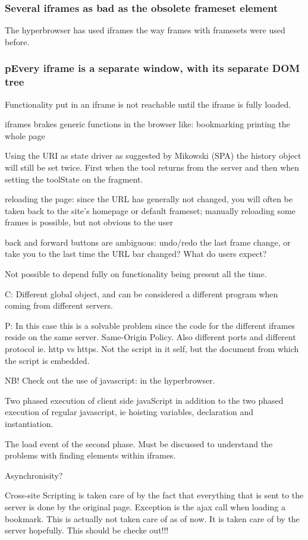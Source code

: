 \documentclass[english]{ifimaster}
\begin{document}
\subsubsection{Several iframes as bad as the obsolete frameset element}
The hyperbrowser has used iframes the way frames with framesets were used before.
\subsubsection{pEvery iframe is a separate window, with its separate DOM tree}
Functionality put in an iframe is not reachable until the iframe is fully loaded.

iframes brakes generic functions in the browser like:
bookmarking
printing the whole page

Using the URI as state driver as suggested by Mikowski (SPA) the history object will still be set twice. First when the tool returns from the server and then when setting the toolState on the fragment.

reloading the page: since the URL has generally not changed, you will often be taken back to the site's homepage or default frameset; manually reloading some frames is possible, but not obvious to the user

back and forward buttons are ambiguous: undo/redo the last frame change, or take you to the last time the URL bar changed? What do users expect?

Not possible to depend fully on functionality being present all the time.

C: Different global object, and can be considered a different program when coming from different servers.

P: In this case this is a solvable problem since the code for the different iframes reside on the same server. Same-Origin Policy. Also different ports and different protocol ie. http vs https. Not the script in it self, but the document from which the script is embedded.


NB! Check out the use of javascript: in the hyperbrowser.

Two phased execution of client side javaScript in addition to the two phased execution of regular javascript, ie hoisting variables, declaration and instantiation.

The load event of the second phase. Must be discussed to understand the problems with finding elements within iframes.

Asynchronisity? 

Cross-site Scripting is taken care of by the fact that everything that is sent to the server is done by the original page. Exception is the ajax call when loading a bookmark. This is actually not taken care of as of now. It is taken care of by the server hopefully. This should be checke out!!!
\end{document}
